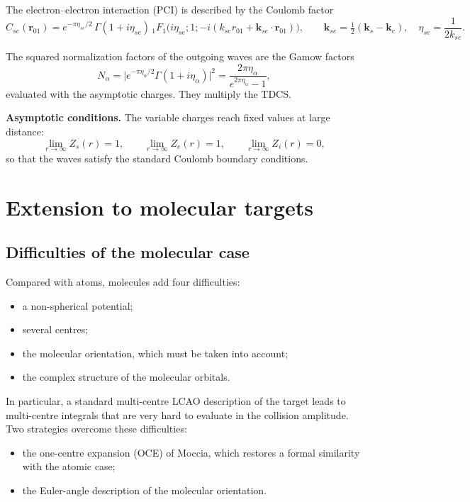 \documentclass[11pt,a4paper]{article}
\newcommand{\bk}{\mathbf k}
\newcommand{\br}{\mathbf r}
\begin{document}
The electron--electron interaction (PCI) is described by the Coulomb factor~\cite{Brauner1989}
\begin{equation}
C_{se}(\br_{01})=e^{-\pi\eta_{se}/2}\,\Gamma(1+i\eta_{se})\,
{}_1F_1\!\big(i\eta_{se};1;-i(k_{se}r_{01}+\bk_{se}\cdot\br_{01})\big),\qquad
\bk_{se}=\tfrac12(\bk_s-\bk_e),\quad \eta_{se}=\frac{1}{2k_{se}}.
\end{equation}

The squared normalization factors of the outgoing waves are the Gamow factors
\begin{equation}
N_\alpha=\big|e^{-\pi\eta_\alpha/2}\Gamma(1+i\eta_\alpha)\big|^2=\frac{2\pi\eta_\alpha}{e^{2\pi\eta_\alpha}-1},
\label{eq:gamow}
\end{equation}
evaluated with the asymptotic charges. They multiply the TDCS.

\textbf{Asymptotic conditions.} The variable charges reach fixed values at large distance:
\begin{equation}
\lim_{r\to\infty}Z_s(r)=1,\qquad \lim_{r\to\infty}Z_e(r)=1,\qquad \lim_{r\to\infty}Z_i(r)=0 ,
\label{eq:asym}
\end{equation}
so that the waves satisfy the standard Coulomb boundary conditions.

\section{Extension to molecular targets}\label{sec:molecule}
\subsection{Difficulties of the molecular case}
Compared with atoms, molecules add four difficulties:
\begin{itemize}
\item a non-spherical potential;
\item several centres;
\item the molecular orientation, which must be taken into account;
\item the complex structure of the molecular orbitals.
\end{itemize}
In particular, a standard multi-centre LCAO description of the target leads to multi-centre
integrals that are very hard to evaluate in the collision amplitude. Two strategies overcome
these difficulties:
\begin{itemize}
\item the one-centre expansion (OCE) of Moccia, which restores a formal similarity with the
  atomic case;
\item the Euler-angle description of the molecular orientation.
\end{itemize}
\end{document}
